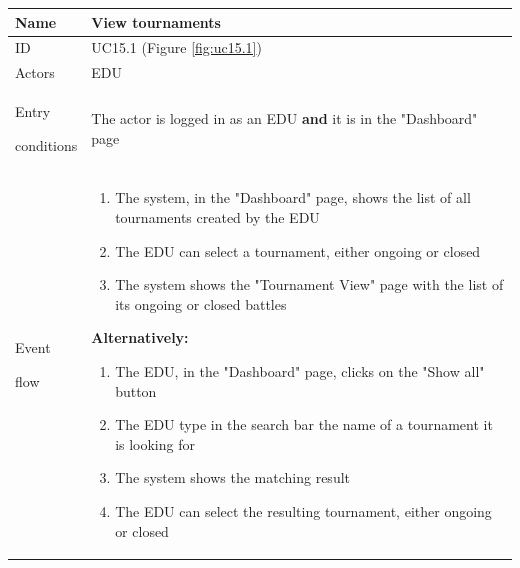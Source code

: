\begin{center}
    \def\arraystretch{1.5}
    \begin{tabular}{| m{2cm} | m{10cm}|}
        \hline
        Name                  & View tournaments                                                                                                                \\ \hline
        ID                    & UC15.1 (Figure \ref{fig:uc15.1})                                                                                                  \\ \hline
        Actors                & EDU                                                                                                                             \\ \hline
        Entry \par conditions & The actor is logged in as an EDU \textbf{and} it is in the "Dashboard" page                                                     \\ \hline
        Event \par flow       & \begin{enumerate}
                                    \item The system, in the "Dashboard" page, shows the list of all tournaments created by the EDU
                                    \item The EDU can select a tournament, either ongoing or closed
                                    \item The system shows the "Tournament View" page with the list of its ongoing or closed battles
                                \end{enumerate}                                                                                                                 
                                \textbf{Alternatively:}
                                \begin{enumerate}
                                    \item The EDU, in the "Dashboard" page, clicks on the "Show all" button
                                    \item The EDU type in the search bar the name of a tournament it is looking for
                                    \item The system shows the matching result 
                                    \item The EDU can select the resulting tournament, either ongoing or closed

\end{enumerate}
\end{tabular}
\end{center}
